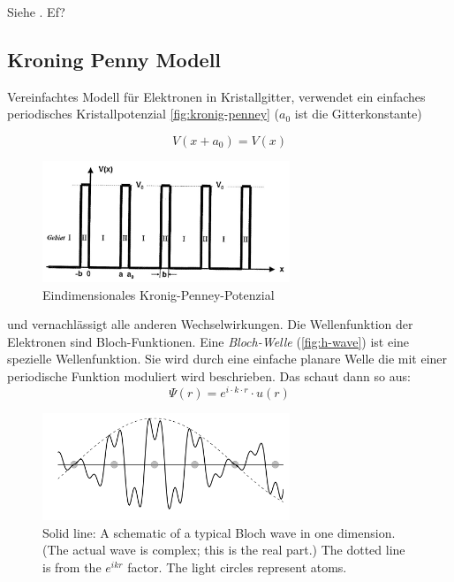 Siehe . Ef?

\subsection{Kroning Penny Modell }\label{k2:kroningpenny}
Vereinfachtes Modell für Elektronen in Kristallgitter, verwendet ein einfaches periodisches Kristallpotenzial \autoref{fig:kronig-penney} ($a_0$ ist die Gitterkonstante)

\begin{equation}
    V(x + a_0) = V(x)
\end{equation}

\begin{figure}
    \centering
    \includegraphics[width=0.66\textwidth]{fig/kronig-penny.jpg}
    \caption{Eindimensionales Kronig-Penney-Potenzial}
    \label{fig:kronig-penney}
\end{figure}

und vernachlässigt alle anderen Wechselwirkungen. Die Wellenfunktion der Elektronen sind Bloch-Funktionen.
Eine \textit{Bloch-Welle} (\autoref{fig:h-wave}) ist eine spezielle Wellenfunktion. Sie wird durch eine einfache planare Welle die mit einer periodische Funktion moduliert wird beschrieben.
Das schaut dann so aus:
\begin{equation}
    \Psi(r) = e^{i\cdot k\cdot r}\cdot u(r)
\end{equation}

\begin{figure}
    \centering
    \includegraphics[width=0.66\textwidth]{fig/bloch-wave}
    \caption{Solid line: A schematic of a typical Bloch wave in one dimension. (The actual wave is complex; this is the real part.) The dotted line is from the $e^{ikr}$ factor. The light circles represent atoms.}
    \label{fig:h-wave}
\end{figure}

